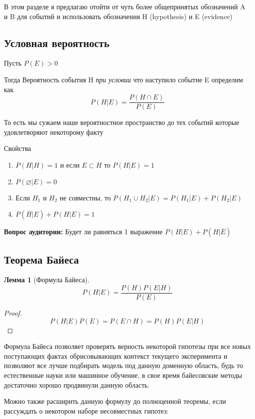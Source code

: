 \documentclass{article}
\newtheorem{lemma}{Лемма}
\theoremstyle{definition}
\newcommand{\question}{\textbf{Вопрос аудитории: }}
\theoremstyle{remark}
\begin{document}
В этом разделе я предлагаю отойти от чуть более общепринятых обозначений A и B для событий и использовать 
обозначения H (hypothesis) и E (evidence)  


\subsection{Условная вероятность}

Пусть $P(E) > 0$ 

Тогда Вероятность события H \textit{при условии} что наступило событие E определим как
$$
P(H | E) = \frac{P(H \cap E)}{P(E)}
$$

То есть мы сужаем наше вероятностное пространство до тех событий которые удовлетворяют некоторому факту

Свойства 
\begin{enumerate}
    \item $P(H | H) = 1$ и если $E \subset H$ то $P(H | E) = 1$
    \item $P(\varnothing | E) = 0$
    \item Если $H_1$ и $H_2$ не совместны, то $P(H_1 \cup H_2 | E) = P(H_1 | E) + P(H_2 | E)$
    \item $P(\overline{H} | E) + P(H | E) = 1$
\end{enumerate}

\question{Будет ли равняться 1 выражение $P(H | E) + P(H | \overline{E})$}

\subsection{Теорема Байеса}

\begin{lemma} [Формула Байеса]
    $$
    P(H | E) = \frac{P(H)P(E | H)}{P(E)}
    $$
\end{lemma}
\begin{proof}
    $$
    P(H | E)P(E) = P(E \cap H) = P(H)P(E | H)
    $$
\end{proof}

Формула Байеса позволяет проверять верность некоторой гипотезы при все новых поступающих фактах обрисовывающих
контекст текущего эксперимента и позволяют все лучше подбирать модель под данную доменную область, будь то естественные науки
или машинное обучение, в свое время байесовские методы достаточно хорошо продвинули данную область.

Можно также расширить данную формулу до полноценной теоремы, если рассуждать о некотором наборе несовместных гипотез:
\end{document}
